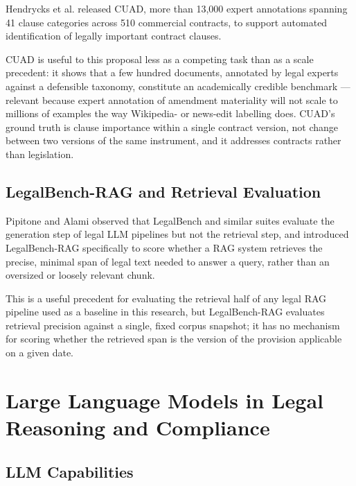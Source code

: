 \label{sec:2-4-3}

Hendrycks et al. \cite{hendrycks2021cuad} released CUAD, more than 13,000 expert annotations spanning 41 clause categories across 510 commercial contracts, to support automated identification of legally important contract clauses.

CUAD is useful to this proposal less as a competing task than as a scale precedent: it shows that a few hundred documents, annotated by legal experts against a defensible taxonomy, constitute an academically credible benchmark — relevant because expert annotation of amendment materiality will not scale to millions of examples the way Wikipedia- or news-edit labelling does. CUAD's ground truth is clause importance within a single contract version, not change between two versions of the same instrument, and it addresses contracts rather than legislation.

\subsection{LegalBench-RAG and Retrieval Evaluation}

\label{sec:2-4-4}

Pipitone and Alami \cite{pipitone2024legalbenchrag} observed that LegalBench and similar suites evaluate the generation step of legal LLM pipelines but not the retrieval step, and introduced LegalBench-RAG specifically to score whether a RAG system retrieves the precise, minimal span of legal text needed to answer a query, rather than an oversized or loosely relevant chunk.

This is a useful precedent for evaluating the retrieval half of any legal RAG pipeline used as a baseline in this research, but LegalBench-RAG evaluates retrieval precision against a single, fixed corpus snapshot; it has no mechanism for scoring whether the retrieved span is the version of the provision applicable on a given date.

\section{Large Language Models in Legal Reasoning and Compliance}

\label{sec:2-5}

\subsection{LLM Capabilities}

\label{sec:2-5-1}

